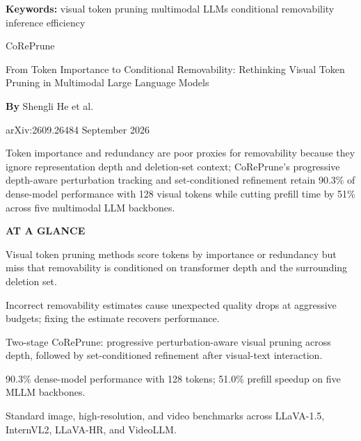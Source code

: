 \documentclass[10pt,twocolumn]{article}
\begin{document}
\setlength{\parindent}{0pt}
\setlength{\parskip}{4pt}

{\small\color{keywordgray}\textbf{Keywords:}
  visual token pruning \textbullet{}
  multimodal LLMs \textbullet{}
  conditional removability \textbullet{}
  inference efficiency}\par\vspace{4pt}

{\LARGE\bfseries\raggedright
  CoRePrune}\par\vspace{4pt}

{\large\itshape\raggedright
  From Token Importance to Conditional Removability:
  Rethinking Visual Token Pruning in Multimodal Large Language Models}\par\vspace{6pt}

{\small\textbf{By} Shengli He et al.}\par\vspace{2pt}

{\small\color{keywordgray}arXiv:2609.26484 \textbullet{} September 2026}
\par\vspace{2pt}\noindent{\color{rulered}\rule{\columnwidth}{0.6pt}}\vspace{6pt}

Token importance and redundancy are poor proxies for removability because
they ignore representation depth and deletion-set context; CoRePrune's
progressive depth-aware perturbation tracking and set-conditioned refinement
retain 90.3\% of dense-model performance with 128 visual tokens while cutting
prefill time by 51\% across five multimodal LLM backbones.

\begin{mdframed}[backgroundcolor=boxgray,linecolor=rulered,linewidth=1pt,
    innerleftmargin=6pt,innerrightmargin=6pt,
    innertopmargin=6pt,innerbottommargin=6pt]
\textbf{\small AT A GLANCE}\par\vspace{4pt}
\begin{description}[leftmargin=0pt,labelsep=4pt,itemsep=2pt,parsep=0pt,
    font=\small\bfseries]
  \item[Problem:] Visual token pruning methods score tokens by importance or
    redundancy but miss that removability is conditioned on transformer depth
    and the surrounding deletion set.
  \item[Why it matters:] Incorrect removability estimates cause unexpected
    quality drops at aggressive budgets; fixing the estimate recovers performance.
  \item[Method:] Two-stage CoRePrune: progressive perturbation-aware visual
    pruning across depth, followed by set-conditioned refinement after
    visual-text interaction.
  \item[Result:] 90.3\% dense-model performance with 128 tokens; 51.0\%
    prefill speedup on five MLLM backbones.
  \item[Evidence:] Standard image, high-resolution, and video benchmarks
    across LLaVA-1.5, InternVL2, LLaVA-HR, and VideoLLM.
\end{description}
\end{mdframed}
\end{document}
